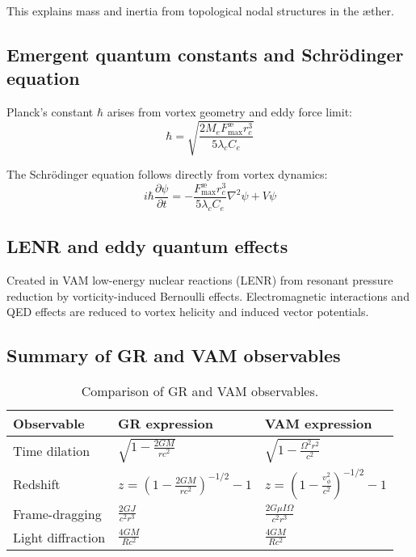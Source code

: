 This explains mass and inertia from topological nodal structures in the æther.

\subsection*{Emergent quantum constants and Schrödinger equation}

Planck's constant $\hbar$ arises from vortex geometry and eddy force limit:
\begin{equation}
    \hbar = \sqrt{\frac{2 M_e F^{\text{\ae}}_{\text{max}} r_c^3}{5 \lambda_c C_e}}
\end{equation}

The Schrödinger equation follows directly from vortex dynamics:
\begin{equation}
    i \hbar \frac{\partial \psi}{\partial t} = -\frac{F^{\text{\ae}}_{\text{max}} r_c^3}{5 \lambda_c C_e}\nabla^2 \psi + V\psi
\end{equation}


\subsection*{LENR and eddy quantum effects}

Created in VAM low-energy nuclear reactions (LENR) from resonant pressure reduction by vorticity-induced Bernoulli effects. Electromagnetic interactions and QED effects are reduced to vortex helicity and induced vector potentials.

\subsection*{Summary of GR and VAM observables}

\begin{table}[h!]
    \centering
    \begin{tabular}{lll}
        \toprule
        \textbf{Observable} & \textbf{GR expression} & \textbf{VAM expression} \\
        \midrule
        Time dilation & $\sqrt{1-\frac{2GM}{rc^2}}$ & $\sqrt{1-\frac{\Omega^2 r^2}{c^2}}$\\[0.5em]
        Redshift & $z=\left(1-\frac{2GM}{rc^2}\right)^{-1/2}-1$ & $z=\left(1-\frac{v_\phi^2}{c^2}\right)^{-1/2}-1$\\[0.5em]
        Frame-dragging & $\frac{2GJ}{c^2 r^3}$ & $\frac{2G\mu I\Omega}{c^2 r^3}$\\[0.5em]
        Light diffraction & $\frac{4GM}{Rc^2}$ & $\frac{4GM}{Rc^2}$\\
        \bottomrule
    \end{tabular}
    \caption{Comparison of GR and VAM observables.}
    \label{tab:equations}
\end{table}